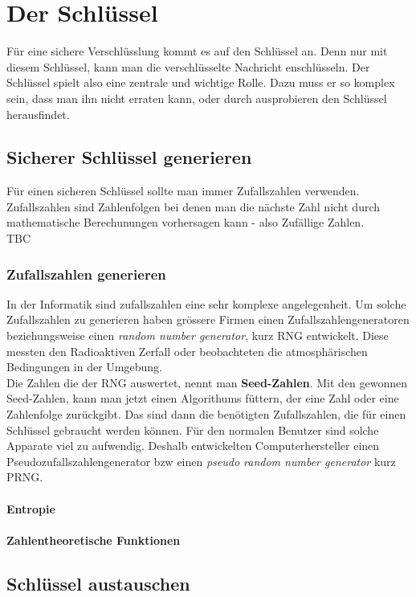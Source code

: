 \section{Der Schlüssel}
Für eine sichere Verschlüsslung kommt es auf den Schlüssel an. Denn nur mit diesem Schlüssel, kann man die verschlüsselte Nachricht enschlüsseln. Der Schlüssel spielt also eine zentrale und wichtige Rolle. Dazu muss er so komplex sein, dass man ihn nicht erraten kann, oder durch ausprobieren den Schlüssel herausfindet.
\subsection{Sicherer Schlüssel generieren}
Für einen sicheren Schlüssel sollte man immer Zufallszahlen verwenden. Zufallszahlen sind Zahlenfolgen bei denen man die nächste Zahl nicht durch mathematische Berechunungen vorhersagen kann - also Zufällige Zahlen.\\
TBC
\subsubsection{Zufallszahlen generieren}
In der Informatik sind zufallszahlen eine sehr komplexe angelegenheit. 
Um solche Zufallszahlen zu generieren haben grössere Firmen einen Zufallszahlengeneratoren beziehungsweise einen \textit{random number generator}, kurz RNG entwickelt. Diese messten den Radioaktiven Zerfall oder beobachteten die atmosphärischen Bedingungen in der Umgebung. \\
Die Zahlen die der RNG auswertet, nennt man \textbf{Seed-Zahlen}. Mit den gewonnen Seed-Zahlen, kann man jetzt einen Algorithums füttern, der eine Zahl oder eine Zahlenfolge zurückgibt. Das sind dann die benötigten Zufallszahlen, die für einen Schlüssel gebraucht werden können.
%
Für den normalen Benutzer sind solche Apparate viel zu aufwendig. Deshalb entwickelten Computerhersteller einen Pseudozufallszahlengenerator bzw einen \textit{pseudo random number generator} kurz PRNG.


\paragraph{Entropie}
\paragraph{Zahlentheoretische Funktionen}
\subsection{Schlüssel austauschen}
